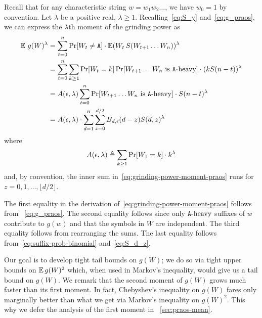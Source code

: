 Recall that for any characteristic string $w = w_1 w_2 \ldots$, 
we have $w_0 = 1$ by convention. 
Let $\lambda$ be a positive real, $\lambda \geq 1$. 
Recalling~\eqref{eq:S_y} and~\eqref{eq:g_praos}, 
we can express the $\lambda$th moment of the grinding power as
\begin{align}\label{eq:grinding-power-moment-praos}
    \Exp\, g(W)^\lambda 
    &= \sum_{t = 0}^n \Pr[W_t \neq \A] \cdot \Exp (W_t\, S(W_{t+1}\ldots W_n))^\lambda \nonumber \\
    &= \sum_{t = 0}^n
    \sum_{k \geq 1} 
      \Pr[W_{t} = k] \Pr[\text{$W_{t+1}\ldots W_n$ is $\Aheavy$}]\cdot (k S(n - t) )^\lambda \nonumber \\
    &= A(\epsilon, \lambda) 
      \sum_{t = 0}^n 
      \Pr[\text{$W_{t+1}\ldots W_n$ is $\Aheavy$}]\cdot S(n-t)^\lambda \nonumber \\
    &=  %
        A(\epsilon, \lambda)
        \cdot 
        \sum_{d=1}^n \sum_{z = 0}^{ d/2 } B_{d, \epsilon}(d - z) S(d,z)^\lambda
\end{align}
where 
\begin{equation}
  A(\epsilon, \lambda) \triangleq \sum_{k\geq 1} \Pr[W_1 = k] \cdot k^\lambda
  \label{eq:A}
\end{equation}
and, by convention, 
the inner sum in~\eqref{eq:grinding-power-moment-praos} 
runs for $z = 0, 1, \ldots, \lfloor d/2 \rfloor$.




The first equality in the derivation of~\eqref{eq:grinding-power-moment-praos} follows from 
~\eqref{eq:g_praos}. 
The second equality follows 
since only $\mathtt{A}\text{-heavy}$ suffixes of $w$ contribute to $g(w)$ 
and that the symbols in $W$ are independent. 
The third equality follows from rearranging the sums. 
The last equality follows from~\eqref{eq:suffix-prob-binomial} 
and~\eqref{eq:S_d_z}.

Our goal is to develop tight tail bounds on $g(W)$; 
we do so via tight upper bounds on $\operatorname{\mathbb{E}} g(W)^2$ 
which, when used in Markov's inequality, 
would give us a tail bound on $g(W)$. 
We remark that the second moment of $g(W)$ grows 
much faster than its first moment. In fact, 
Chebyshev's inequality on $g(W)$ 
fares only marginally better 
than what we get via Markov's inequality on $g(W)^2$. 
This why we defer the analysis of the first moment in 
\Section~\ref{sec:praos-mean}.


